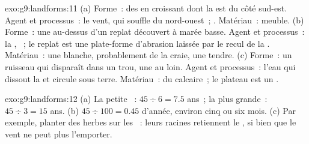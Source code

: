 \begin{solution}{exo:g9:landforms:11}
(a) Forme~: des  en croissant dont la  est du côté
sud-est. Agent et processus~: le vent, qui souffle du nord-ouest~; .
Matériau~:  meuble. (b) Forme~: une  au-dessus d'un replat
découvert à marée basse. Agent et processus~: la , ~; le replat
est une plate-forme d'abrasion laissée par le recul de la .
Matériau~: une  blanche, probablement de la craie, une  tendre.
(c) Forme~: un ruisseau qui disparaît dans un trou, une  au loin.
Agent et processus~: l'eau qui dissout la  et circule sous terre.
Matériau~: du calcaire~; le plateau est un .
\end{solution}

\begin{solution}{exo:g9:landforms:12}
(a) La petite ~: $45 \div 6 = 7.5$ ans~; la plus grande~: $45 \div 3 =
15$ ans. (b) $45 \div 100 = 0.45$ d'année, environ cinq ou six mois.
(c) Par exemple, planter des herbes sur les ~: leurs racines
retiennent le , si bien que le vent ne peut plus l'emporter.
\end{solution}

